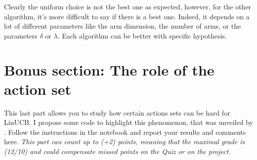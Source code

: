 Clearly the uniform choice is not the best one as expected, however, for the other algorithm, it's more difficult to say if there is a best one. 
Indeed, it depends on a lot of different parameters like the arm dimension, the number of arms, or the parameters $\delta$ or $\lambda$.
Each algorithm can be better with specific hypothesis.





\newpage





\appendix

\section{Bonus section: The role of the action set}

This last part allows you to study how certain actions sets can be hard for LinUCB. I propose some code to highlight this phenomenon, that was unveiled by \citet{lattimore2017end}. 
Follow the instructions in the notebook and report your results and comments here. 
\emph{This part can count up to (+2) points, meaning that the maximal grade is (12/10) and could compensate missed points on the Quiz or on the project. }

